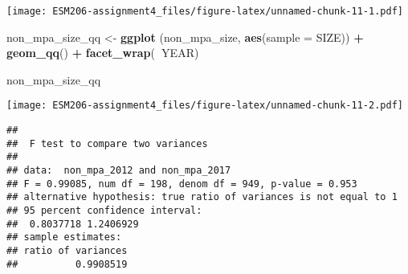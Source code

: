 \documentclass[]{article}
\newenvironment{Shaded}{\begin{snugshade}}{\end{snugshade}}
\newcommand{\KeywordTok}[1]{\textcolor[rgb]{0.13,0.29,0.53}{\textbf{#1}}}
\newcommand{\DataTypeTok}[1]{\textcolor[rgb]{0.13,0.29,0.53}{#1}}
\newcommand{\DecValTok}[1]{\textcolor[rgb]{0.00,0.00,0.81}{#1}}
\newcommand{\StringTok}[1]{\textcolor[rgb]{0.31,0.60,0.02}{#1}}
\newcommand{\CommentTok}[1]{\textcolor[rgb]{0.56,0.35,0.01}{\textit{#1}}}
\newcommand{\OperatorTok}[1]{\textcolor[rgb]{0.81,0.36,0.00}{\textbf{#1}}}
\newcommand{\NormalTok}[1]{#1}
\begin{document}
\texttt{[image: ESM206-assignment4\_files/figure-latex/unnamed-chunk-11-1.pdf]}

\begin{Shaded}
\begin{Highlighting}[]
\NormalTok{non_mpa_size_qq <-}\StringTok{ }\KeywordTok{ggplot}\NormalTok{ (non_mpa_size, }\KeywordTok{aes}\NormalTok{(}\DataTypeTok{sample =}\NormalTok{ SIZE)) }\OperatorTok{+}
\StringTok{  }\KeywordTok{geom_qq}\NormalTok{() }\OperatorTok{+}
\StringTok{  }\KeywordTok{facet_wrap}\NormalTok{(}\OperatorTok{~}\NormalTok{YEAR)}

\NormalTok{non_mpa_size_qq}
\end{Highlighting}
\end{Shaded}

\texttt{[image: ESM206-assignment4\_files/figure-latex/unnamed-chunk-11-2.pdf]}

\begin{Shaded}
\end{Shaded}

\begin{verbatim}
## 
##  F test to compare two variances
## 
## data:  non_mpa_2012 and non_mpa_2017
## F = 0.99085, num df = 198, denom df = 949, p-value = 0.953
## alternative hypothesis: true ratio of variances is not equal to 1
## 95 percent confidence interval:
##  0.8037718 1.2406929
## sample estimates:
## ratio of variances 
##          0.9908519
\end{verbatim}
\end{document}
